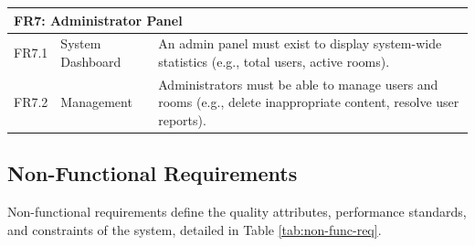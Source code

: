 \begin{longtable}{l l p{9cm}}
\multicolumn{3}{l}{\textbf{FR7: Administrator Panel}} \\
\midrule
FR7.1 & System Dashboard & An admin panel must exist to display system-wide statistics (e.g., total users, active rooms). \\
FR7.2 & Management & Administrators must be able to manage users and rooms (e.g., delete inappropriate content, resolve user reports). \\

\end{longtable}

\subsection{Non-Functional Requirements}

Non-functional requirements define the quality attributes, performance standards, and constraints of the system, detailed in Table \ref{tab:non-func-req}.

